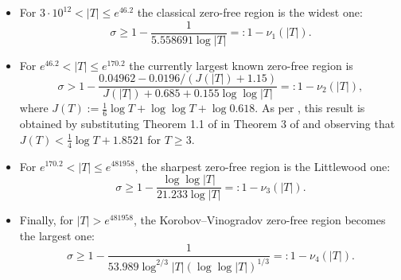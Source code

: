 \documentclass[reqno]{amsart}
\numberwithin{equation}{section}
\theoremstyle{remark}
\begin{document}
\begin{itemize}
    \item For $3\cdot 10^{12}< |T|\le e^{46.2}$ the classical zero-free region \cite{mossinghoff2024explicit} is the widest one:
    \begin{equation}\label{classicalzerofree}
        \sigma\ge 1-\frac{1}{5.558691 \log |T|}=:1-\nu_1(|T|).
    \end{equation}
    \item For $ e^{46.2}<|T|\le e^{170.2}$ the currently largest known zero-free region is \begin{equation}\label{zerofreeintermediate}
\sigma>1-\frac{0.04962-0.0196 /(J(|T|)+1.15)}{J(|T|)+0.685+0.155 \log \log |T|}=:1-\nu_2(|T|),
\end{equation}
where $J(T):=\frac{1}{6} \log T+\log \log T+\log 0.618$. As per \cite{YANG2024128124}, this result is obtained by substituting Theorem 1.1 of \cite{hiary_improved_2024} in Theorem 3 of \cite{ford_zero_2022} and observing that $J(T)<\frac{1}{4} \log T+1.8521$ for $T\geq 3$.
\item For $e^{170.2}< |T|\le e^{481958}$, the sharpest zero-free region \cite{YANG2024128124} is the Littlewood one:
\begin{equation}\label{littlewoodzerofree}
    \sigma\ge 1-\frac{\log\log |T|}{21.233\log |T|}=:1-\nu_3(|T|).
\end{equation}
\item Finally, for $|T|> e^{481958}$, the Korobov--Vinogradov zero-free region \cite{BELLOTTI2024128249} becomes the largest one: \begin{equation}\label{kvzerofree}
     \sigma\ge  1-\frac{1}{53.989\log^{2/3}|T|(\log\log |T|)^{1/3}}=:1-\nu_4(|T|).
\end{equation}
\end{itemize}
\end{document}
